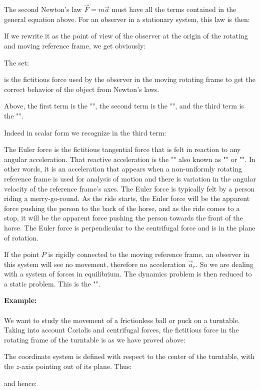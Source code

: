 	The second Newton's law $\vec{F}=m\vec{a}$ must have all the terms contained in the general equation above. For an observer in a stationary system, this law is then:
	
	If we rewrite it as the point of view of the observer at the origin of the rotating and moving reference frame, we get obviously:
	
	The set:
	
	is the fictitious force used by the observer in the moving rotating frame to get the correct behavior of the object from Newton's laws.
	
	Above, the first term is the "", the second term is the "", and the third term is the "".
	
	Indeed in scalar form we recognize in the third term:
	
	
	The Euler force is the fictitious tangential force that is felt in reaction to any angular acceleration. That reactive acceleration is the "" also known as "" or "".  In other words, it is an acceleration that appears when a non-uniformly rotating reference frame is used for analysis of motion and there is variation in the angular velocity of the reference frame's axes. The Euler force is typically felt by a person riding a merry-go-round. As the ride starts, the Euler force will be the apparent force pushing the person to the back of the horse, and as the ride comes to a stop, it will be the apparent force pushing the person towards the front of the horse. The Euler force is perpendicular to the centrifugal force and is in the plane of rotation.	
	
	If the point $P$ is rigidly connected to the moving reference frame, an observer in this system will see no movement, therefore no acceleration $\vec{a}_r$. So we are dealing with a system of forces in equilibrium. The dynamics problem is then reduced to a static problem. This is the "".
	\begin{tcolorbox}[colframe=black,colback=white,sharp corners]
	\textbf{{\Large {}}Example:}\\\\
	We want to study the movement of a frictionless ball or puck on a turntable.\\

	Taking into account Coriolis and centrifugal forces, the fictitious force in the rotating frame of the turntable is as we have proved above:
	
	The coordinate system is defined with respect to the center of the turntable, with the $z$-axis pointing out of its plane. Thus:
	
	and hence:
	
	\end{tcolorbox}
	

